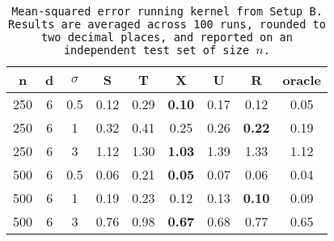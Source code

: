 \begin{table}[ht]
\centering
\begin{tabular}{ccccccccc}
  \hline
n & d & $\sigma$ & S & T & X & U & R & oracle \\ 
  \hline
250 & 6 & 0.5 & 0.12 & 0.29 & \bf 0.10 &  0.17 & 0.12 & 0.05 \\ 
  250 & 6 & 1 & 0.32 & 0.41 & 0.25 &  0.26 & \bf 0.22 & 0.19 \\ 
  250 & 6 & 3 & 1.12 & 1.30 & \bf 1.03 &  1.39 & 1.33 & 1.12 \\ 
  500 & 6 & 0.5 & 0.06 & 0.21 & \bf 0.05 &  0.07 & 0.06 & 0.04 \\ 
  500 & 6 & 1 & 0.19 & 0.23 & 0.12 &  0.13 & \bf 0.10 & 0.09 \\ 
  500 & 6 & 3 & 0.76 & 0.98 & \bf 0.67 &  0.68 & 0.77 & 0.65 \\ 
   \hline
\end{tabular}
\caption{\tt Mean-squared error running \texttt{kernel} from Setup B. Results are averaged across 100 runs, rounded to two decimal places, and reported on an independent test set of size $n$.} 
\label{table:setup2}
\end{table}
